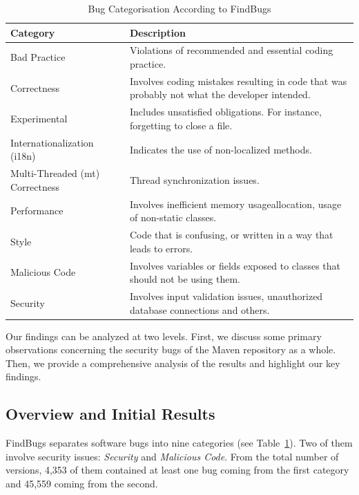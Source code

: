 \documentclass[conference]{llncs}
\begin{document}
\begin{table}
\centering
\caption{Bug Categorisation According to FindBugs}
\label{tbl:bug-cat}
\begin{tabular}{l p{15em}}
\hline
Category & Description\\
\hline
Bad Practice & Violations of recommended and essential
coding practice. \\
Correctness & Involves coding mistakes resulting in code
that was probably not what the developer intended. \\
Experimental & Includes unsatisfied obligations. For instance,
forgetting to close a file. \\
Internationalization (i18n) & Indicates the use of non-localized methods. \\
Multi-Threaded ({\sc mt}) Correctness & Thread synchronization issues. \\
Performance & Involves inefficient memory usageallocation, usage 
of non-static classes. \\
Style & Code that is confusing, or
written in a way that leads to errors.\\
Malicious Code & Involves variables or fields exposed to classes that should
not be using them. \\
Security & Involves input validation issues, unauthorized database connections
and others. \\
\hline
\end{tabular}
\end{table}

Our findings can be analyzed at two levels. First, we discuss some
primary observations concerning the security bugs of the Maven repository as a whole.
Then, we provide a comprehensive analysis of the results and highlight our key findings.

\subsection{Overview and Initial Results}
\label{sec:overview}

FindBugs separates software bugs into nine categories (see
Table~\ref{tbl:bug-cat}). Two of them involve security issues: {\it Security} and {\it
Malicious Code}. From the total number of versions, 4,353 of them contained
at least one bug coming from the first category
and 45,559 coming from the second.
\end{document}
